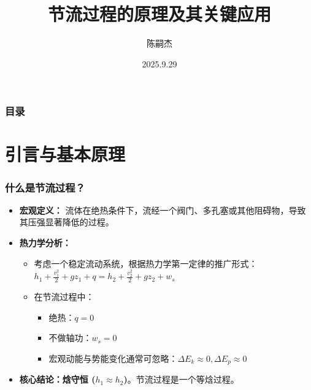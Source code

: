 \documentclass{beamer}
\title{节流过程的原理及其关键应用}
\author{陈嗣杰}
\institute{课程：热力学与统计物理}
\date{2025.9.29}
\begin{document}
\begin{frame}
  \titlepage
\end{frame}

\begin{frame}
  \frametitle{目录}
  \tableofcontents
\end{frame}


\section{引言与基本原理}

\begin{frame}
  \frametitle{什么是节流过程？}
  \begin{itemize}
    \item<1-> \textbf{宏观定义：} 流体在\alert{绝热}条件下，流经一个阀门、多孔塞或其他阻碍物，导致其\alert{压强显著降低}的过程。
    \item<2-> \textbf{热力学分析：}
    \begin{itemize}
      \item 考虑一个稳定流动系统，根据热力学第一定律的推广形式：
      $h_1 + \frac{v_1^2}{2} + gz_1 + q = h_2 + \frac{v_2^2}{2} + gz_2 + w_s$
      \item 在节流过程中：
      \begin{itemize}
          \item 绝热：$q=0$
          \item 不做轴功：$w_s=0$
          \item 宏观动能与势能变化通常可忽略：$\Delta E_k \approx 0, \Delta E_p \approx 0$
      \end{itemize}
    \end{itemize}
    \item<3-> \textbf{核心结论：\alert{焓守恒 ($h_1 \approx h_2$)}}。节流过程是一个\alert{等焓}过程。
    
  \end{itemize}
\end{frame}
\end{document}
